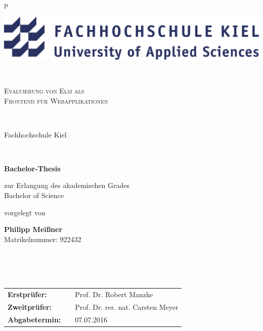 \begin{center}
\begin{tabular}{p{\textwidth}}


\begin{center}
\centerline{\includegraphics[scale=0.13]{img/logo.png}}
\end{center}


\\

\begin{center}
\LARGE{\textsc{
Evaluierung von Elm als\\ Frontend für Webapplikationen
}}
\end{center}

\\


\begin{center}
\large{Fachhochschule Kiel}
\end{center}

\\

\begin{center}
\textbf{\Large{Bachelor-Thesis}}
\end{center}


\begin{center}
zur Erlangung des akademischen Grades\\
Bachelor of Science
\end{center}


\begin{center}
vorgelegt von
\end{center}

\begin{center}
\large{\textbf{Philipp Meißner}} \\
\small{Matrikelnummer: 922432}
\end{center}


\\

\\\\


\begin{center}
\begin{tabular}{lll}
\textbf{Erstprüfer:} & & Prof. Dr. Robert Manzke\\
\textbf{Zweitprüfer:} & &Prof. Dr. rer. nat. Carsten Meyer\\
\textbf{Abgabetermin:} & & 07.07.2016\\
\end{tabular}
\end{center}

\end{tabular}
\end{center}